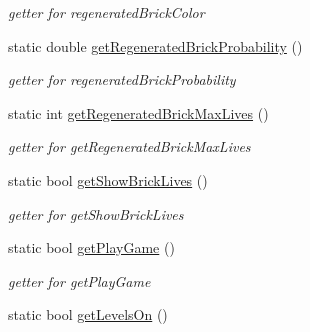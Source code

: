 \begin{DoxyCompactItemize}
\begin{DoxyCompactList}\small\item\em getter for regenerated\+Brick\+Color \end{DoxyCompactList}\item 
\hypertarget{class_config_reader_a7fc0b7dcd7ffb4af43e4bcfce0962e3d}{static double \hyperlink{class_config_reader_a7fc0b7dcd7ffb4af43e4bcfce0962e3d}{get\+Regenerated\+Brick\+Probability} ()}\label{class_config_reader_a7fc0b7dcd7ffb4af43e4bcfce0962e3d}

\begin{DoxyCompactList}\small\item\em getter for regenerated\+Brick\+Probability \end{DoxyCompactList}\item 
\hypertarget{class_config_reader_a8f3e4e62eb99c64631c59e9eb1f4f7a2}{static int \hyperlink{class_config_reader_a8f3e4e62eb99c64631c59e9eb1f4f7a2}{get\+Regenerated\+Brick\+Max\+Lives} ()}\label{class_config_reader_a8f3e4e62eb99c64631c59e9eb1f4f7a2}

\begin{DoxyCompactList}\small\item\em getter for get\+Regenerated\+Brick\+Max\+Lives \end{DoxyCompactList}\item 
\hypertarget{class_config_reader_a225c16c1d8cd278933d9340af1cab003}{static bool \hyperlink{class_config_reader_a225c16c1d8cd278933d9340af1cab003}{get\+Show\+Brick\+Lives} ()}\label{class_config_reader_a225c16c1d8cd278933d9340af1cab003}

\begin{DoxyCompactList}\small\item\em getter for get\+Show\+Brick\+Lives \end{DoxyCompactList}\item 
\hypertarget{class_config_reader_ac6e6c43cee52bc63bfc002627fcea560}{static bool \hyperlink{class_config_reader_ac6e6c43cee52bc63bfc002627fcea560}{get\+Play\+Game} ()}\label{class_config_reader_ac6e6c43cee52bc63bfc002627fcea560}

\begin{DoxyCompactList}\small\item\em getter for get\+Play\+Game \end{DoxyCompactList}\item 
\hypertarget{class_config_reader_a8023a4127022e0a5a601b6e94407b2af}{static bool \hyperlink{class_config_reader_a8023a4127022e0a5a601b6e94407b2af}{get\+Levels\+On} ()}\label{class_config_reader_a8023a4127022e0a5a601b6e94407b2af}


\end{DoxyCompactItemize}
